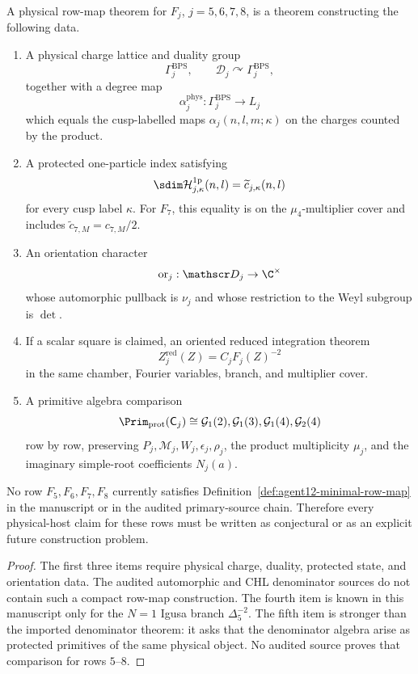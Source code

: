 \begin{definition}
\label{def:agent12-minimal-row-map}
A physical row-map theorem for \(F_j\), \(j=5,6,7,8\), is a theorem
constructing the following data.
\begin{enumerate}
\item A physical charge lattice and duality group
\[
\Gamma_j^{\mathrm{BPS}},\qquad \mathscr D_j\curvearrowright
\Gamma_j^{\mathrm{BPS}},
\]
together with a degree map
\[
\alpha_j^{\mathrm{phys}}:\Gamma_j^{\mathrm{BPS}}\to L_j
\]
which equals the cusp-labelled maps
\(\alpha_j(n,l,m;\kappa)\) on the charges counted by the product.
\item A protected one-particle index satisfying
\[
\sdim\mathcal H^{1\mathrm p}_{j,\kappa}(n,l)
=\widetilde c_{j,\kappa}(n,l)
\]
for every cusp label \(\kappa\).  For \(F_7\), this equality is on the
\(\mu_4\)-multiplier cover and includes
\(\widetilde c_{7,M}=c_{7,M}/2\).
\item An orientation character
\[
\operatorname{or}_j:\mathscr D_j\to\C^\times
\]
whose automorphic pullback is \(\nu_j\) and whose restriction to the
Weyl subgroup is \(\det\).
\item If a scalar square is claimed, an oriented reduced integration
theorem
\[
Z_j^{\mathrm{red}}(Z)=C_jF_j(Z)^{-2}
\]
in the same chamber, Fourier variables, branch, and multiplier cover.
\item A primitive algebra comparison
\[
\Prim_{\mathrm{prot}}(\mathsf C_j)
\cong\mathcal G_1(2),\mathcal G_1(3),\mathcal G_1(4),
\mathcal G_2(4)
\]
row by row, preserving \(P_j,\mathcal M_j,W_j,\epsilon_j,\rho_j\), the
product multiplicity \(\mu_j\), and the imaginary simple-root
coefficients \(N_j(a)\).
\end{enumerate}
\end{definition}

\begin{theorem}
No row \(F_5,F_6,F_7,F_8\) currently satisfies
Definition~\ref{def:agent12-minimal-row-map} in the manuscript or in
the audited primary-source chain.  Therefore every physical-host claim
for these rows must be written as conjectural or as an explicit future
construction problem.
\end{theorem}

\begin{proof}
The first three items require physical charge, duality, protected state,
and orientation data.  The audited automorphic and CHL denominator
sources do not contain such a compact row-map construction.  The fourth
item is known in this manuscript only for the \(N=1\) Igusa branch
\(\Delta_5^{-2}\).  The fifth item is stronger than the imported
denominator theorem: it asks that the denominator algebra arise as
protected primitives of the same physical object.  No audited source
proves that comparison for rows \(5\)--\(8\).
\end{proof}

